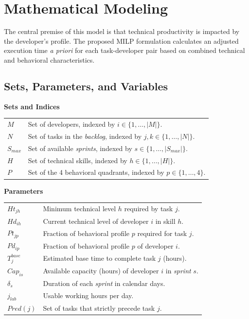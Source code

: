 \documentclass[a4paper,11pt]{article}
\begin{document}
\section{Mathematical Modeling}

The central premise of this model is that technical productivity is impacted 
by the developer's profile. The proposed MILP formulation calculates an adjusted 
execution time \textit{a priori} for each task-developer pair based on combined 
technical and behavioral characteristics.

\subsection{Sets, Parameters, and Variables}

\vspace{0.3cm}
\noindent\textbf{Sets and Indices}
\begin{center}
    \begin{tabular}{p{2.5cm} p{12cm}}
        $M$ & Set of developers, indexed by $i \in \{1, \dots, |M|\}$. \\
        $N$ & Set of tasks in the \textit{backlog}, indexed by $j, k \in \{1, \dots, |N|\}$. \\
        $S_{max}$ & Set of available \textit{sprints}, indexed by $s \in \{1, \dots, |S_{max}|\}$. \\
        $H$ & Set of technical skills, indexed by $h \in \{1, \dots, |H|\}$. \\
        $P$ & Set of the 4 behavioral quadrants, indexed by $p \in \{1, \dots, 4\}$.
    \end{tabular}
\end{center}

\vspace{0.3cm}
\noindent\textbf{Parameters}
\begin{center}
    \begin{tabular}{p{2.5cm} p{12cm}}
        $Ht_{jh}$ & Minimum technical level $h$ required by task $j$. \\
        $Hd_{ih}$ & Current technical level of developer $i$ in skill $h$. \\
        $Pt_{jp}$ & Fraction of behavioral profile $p$ required for task $j$. \\
        $Pd_{ip}$ & Fraction of behavioral profile $p$ of developer $i$. \\
        $T^{base}_j$ & Estimated base time to complete task $j$ (hours). \\
        $Cap_{is}$ & Available capacity (hours) of developer $i$ in \textit{sprint} $s$. \\
        $\delta_s$ & Duration of each \textit{sprint} in calendar days. \\
        $j_{lab}$ & Usable working hours per day. \\
        $Pred(j)$ & Set of tasks that strictly precede task $j$.
    \end{tabular}
\end{center}
\end{document}
